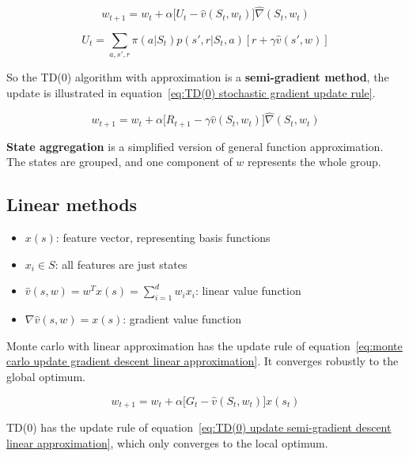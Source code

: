 \begin{equation}
w_{t+1} = w_t + \alpha \big[ U_t - \hat{v}(S_t, w_t) \big] \hat{\nabla}(S_t, w_t)
\label{eq:stochastic gradient descent monte carlo update rule}
\end{equation}

\begin{equation}
U_t = \sum_{a,s',r} \pi(a|S_t)p(s', r| S_t, a)[r+ \gamma\hat{v}(s', w)]
\label{eq:bootstrapping Ut approximation}
\end{equation}

So the TD(0) algorithm with approximation is a \textbf{semi-gradient method}, the update is illustrated in equation~\ref{eq:TD(0) stochastic gradient update rule}.

\begin{equation}
w_{t+1} = w_t + \alpha \big[ R_{t+1} - \gamma \hat{v}(S_t, w_t) \big] \hat{\nabla}(S_t, w_t)
\label{eq:TD(0) stochastic gradient update rule}
\end{equation}

\textbf{State aggregation} is a simplified version of general function approximation. The states are grouped, and one component of $w$ represents the whole group.

\subsection{Linear methods}
\begin{itemize}
	\item $x(s)$: feature vector, representing basis functions
	\item $x_i \in S$: all features are just states
	\item $\hat{v}(s, w) = w^Tx(s) = \sum_{i=1}^{d}w_ix_i$: linear value function
	\item $\nabla \hat{v}(s, w) = x(s)$: gradient value function
\end{itemize}

Monte carlo with linear approximation has the update rule of equation~\ref{eq:monte carlo update gradient descent linear approximation}. It converges robustly to the global optimum.

\begin{equation}
w_{t+1} = w_t + \alpha \big[ G_t - \hat{v}(S_t, w_t) \big]x(s_t)
\label{eq:monte carlo update gradient descent linear approximation}
\end{equation}

TD(0) has the update rule of equation~\ref{eq:TD(0) update semi-gradient descent linear approximation}, which only converges to the local optimum. 

